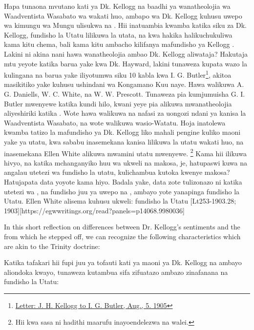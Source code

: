 Hapa tunaona mvutano kati ya Dk. Kellogg na baadhi ya wanatheolojia wa Waadventista Wasabato wa wakati huo, ambapo  wa Dk. Kellogg kuhusu uwepo wa kimungu wa Mungu ulisukwa na . Hii inatuambia kwamba katika siku za Dk. Kellogg, fundisho la Utatu lilikuwa la utata, na kwa hakika halikuchukuliwa kama kitu chema, bali kama kitu ambacho kilifanya mafundisho ya Kellogg . Lakini ni akina nani hawa wanatheolojia ambao Dk. Kellogg aliwataja? Hakutaja mtu yeyote katika barua yake kwa Dk. Hayward, lakini tunaweza kupata wazo la  kulingana na barua yake iliyotumwa siku 10 kabla kwa I. G. Butler\footnote{\href{https://forgotten-pillar.s3.us-east-2.amazonaws.com/1905-08-05-kellogg-butler.pdf}{Letter: J. H. Kellogg to I. G. Butler, Aug., 5. 1905}}, akitoa masikitiko yake kuhusu ushindani wa Kongamano Kuu naye. Hawa walikuwa A. G. Daniells, W. C. White, na W. W. Prescott. Tunaweza pia kumjumuisha G. I. Butler mwenyewe katika kundi hilo, kwani yeye pia alikuwa mwanatheolojia aliyeshiriki katika . Wote hawa walikuwa na nafasi za uongozi ndani ya kanisa la Waadventista Wasabato, na wote walikuwa wasio-Watatu. Hoja inatolewa kwamba tatizo la mafundisho ya Dk. Kellogg liko mahali pengine kuliko maoni yake ya utatu, kwa sababu inasemekana kanisa lilikuwa la utatu wakati huo, na inasemekana Ellen White alikuwa mwamini utatu mwenyewe. \footnote{Hii kwa sasa ni hadithi maarufu inayoendelezwa na walei.} Kama hii ilikuwa hivyo, na katika mchanganyiko huu wa ukweli na makosa, je, hatupaswi kuwa na angalau utetezi wa fundisho la utatu, kulichambua kutoka kwenye makosa? Hatujapata data yoyote kama hiyo. Badala yake, data zote tulizonazo ni katika utetezi wa , na fundisho juu ya uwepo na , ambayo yote yanapinga fundisho la Utatu. Ellen White alisema kuhusu ukweli: fundisho la Utatu [Lt253-1903.28; 1903][https://egwwritings.org/read?panels=p14068.9980036]


In this short reflection on differences between Dr. Kellogg's sentiments and the  from which he stepped off, we can recognize the following characteristics which are akin to the Trinity doctrine:


Katika tafakari hii fupi juu ya tofauti kati ya maoni ya Dk. Kellogg na  ambayo aliondoka kwayo, tunaweza kutambua sifa zifuatazo ambazo zinafanana na fundisho la Utatu:


